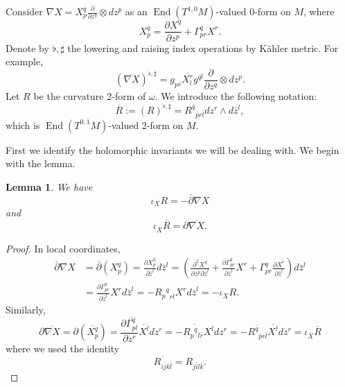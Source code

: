 \documentclass[12pt,reqno,a4paper]{amsart}
\numberwithin{equation}{section}
\def\bz{\bar z}
\def\bi{\bar i}
\def\bj{\bar j}
\def\bk{\bar k}
\def\bl{\bar l}
\def\br{\bar r}
\def\p{\partial}
\def\bp{\bar\partial}
\DeclareMathOperator{\End}{End}
\newtheorem{lem}[theo]{{\sc Lemma}}
\theoremstyle{remark}
\theoremstyle{dotless}
\begin{document}
Consider $\nabla X = X^q_p \frac{\p}{\p z^q}\otimes dz^p$ as an $\End(T^{1,0}M)$-valued $0$-form on $M$, where
\begin{equation*}
X^q_p=\frac{\p X^q}{\p z^p}+\Gamma^{q}_{pr}X^r.
\end{equation*}
Denote by $\flat,\sharp$ the lowering and raising index operations by K\"ahler metric. For example, 
\begin{equation*}
(\overline{\nabla X})^{\flat,\sharp}=g_{p\br}\overline{X^{r}_{l}}g^{q\bl}\frac{\p}{\p z^q}\otimes dz^p.
\end{equation*}
Let $R$ be the curvature 2-form of $\omega$. We introduce the following notation:
\begin{equation*}
\overline{R}:=(R)^{\flat,\sharp}=R^{\bar{q}}{}_{\bar{p}r\bl}dz^r\wedge d\bar{z}^l,
\end{equation*}
which is $\End(T^{0,1}M)$-valued $2$-form on $M$.

First we identify the holomorphic invariants we will be dealing with. We begin with the lemma.
\begin{lem}\label{lulemm}
We have
\begin{equation}\label{nabx}
\iota_X R = -\bp \nabla X
\end{equation}
and 
\begin{equation}\label{nabx2}
\iota_{\overline{X}} \overline{R} = \p \overline{\nabla X}.
\end{equation}

\end{lem}
\begin{proof}
In local coordinates, 
\begin{align*}
\bp \nabla X &= \bp \left(X^q_p\right) = \frac{\p X^q_p}{\p \bz^l} d\bz^l 
=\left( \frac{\p^2 X^q}{\p z^p \p \bz^l} + \frac{\p \Gamma^{q}_{pr}}{\p \bz^l}X^r + \Gamma^{q}_{pr}\frac{\p X^r}{\p \bz^l} \right)d\bz^l\\
&=\frac{\p \Gamma^{q}_{pr}}{\p \bz^l}X^r d\bz^l = -R_{p}{}^{q}{}_{r\bl}X^rd\bz^l=-\iota_X R.
\end{align*}
Similarly, 
\begin{equation*}
\p \overline{\nabla X}=\p \left(\overline{X^q_p}\right)=\frac{\p \overline{\Gamma^{q}_{pl}}}{\p z^r}\overline{X^l} dz^r=\overline{-R_{p}{}^{q}{}_{l\br}X^l}dz^r=-R^{\bar{q}}{}_{\bar{p}r\bl}\overline{X^l} dz^r = \iota_{\overline{X}} \overline{R}
\end{equation*}
where we used the identity 
\begin{equation*}
\overline{R_{i\bj k\bl}}=R_{j\bi l\bk}.
\end{equation*}
\end{proof}
\end{document}
